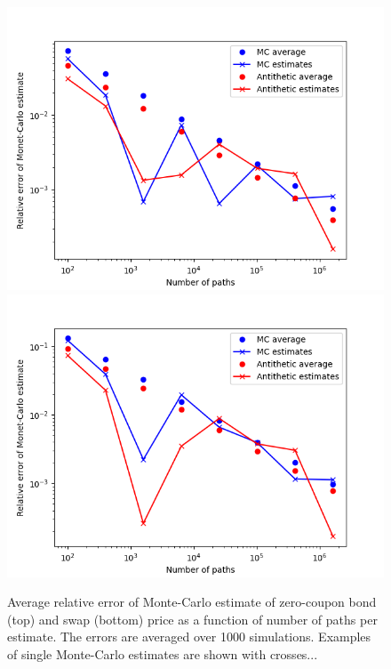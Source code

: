 \begin{figure}
\centering
\includegraphics[scale=0.7]{figures/hw_1f_zero_coupon_bond/mc_error_ZCBond.png}
\includegraphics[scale=0.7]{figures/hw_1f_swap/mc_error_Swap.png}
\caption{Average relative error of Monte-Carlo estimate of zero-coupon bond (top) and swap (bottom) price as a function of number of paths per estimate. The errors are averaged over 1000 simulations. Examples of single Monte-Carlo estimates are shown with crosses...}
\end{figure}

